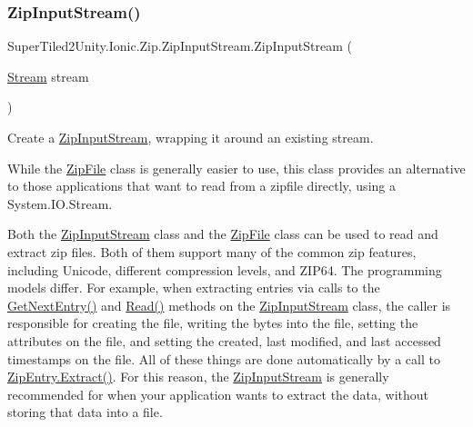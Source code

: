 \subsubsection{\texorpdfstring{Zip\+Input\+Stream()}{ZipInputStream()}\hspace{0.1cm}{\footnotesize\ttfamily [1/3]}}
{\footnotesize\ttfamily Super\+Tiled2\+Unity.\+Ionic.\+Zip.\+Zip\+Input\+Stream.\+Zip\+Input\+Stream (\begin{DoxyParamCaption}\item[{\mbox{\hyperlink{namespace_super_tiled2_unity_1_1_ionic_1_1_zip_a9ced5352c56e7e0fceff15b534073c83aeae835e83c0494a376229f254f7d3392}{Stream}}}]{stream }\end{DoxyParamCaption})}



Create a {\ttfamily \mbox{\hyperlink{class_super_tiled2_unity_1_1_ionic_1_1_zip_1_1_zip_input_stream}{Zip\+Input\+Stream}}}, wrapping it around an existing stream. 

While the \mbox{\hyperlink{class_super_tiled2_unity_1_1_ionic_1_1_zip_1_1_zip_file}{Zip\+File}} class is generally easier to use, this class provides an alternative to those applications that want to read from a zipfile directly, using a System.\+I\+O.\+Stream. 

Both the {\ttfamily \mbox{\hyperlink{class_super_tiled2_unity_1_1_ionic_1_1_zip_1_1_zip_input_stream}{Zip\+Input\+Stream}}} class and the {\ttfamily \mbox{\hyperlink{class_super_tiled2_unity_1_1_ionic_1_1_zip_1_1_zip_file}{Zip\+File}}} class can be used to read and extract zip files. Both of them support many of the common zip features, including Unicode, different compression levels, and Z\+I\+P64. The programming models differ. For example, when extracting entries via calls to the {\ttfamily \mbox{\hyperlink{class_super_tiled2_unity_1_1_ionic_1_1_zip_1_1_zip_input_stream_afd108d06a4650f63b0ec80d0698fc886}{Get\+Next\+Entry()}}} and {\ttfamily \mbox{\hyperlink{class_super_tiled2_unity_1_1_ionic_1_1_zip_1_1_zip_input_stream_a172a23a02d3c7a34db7c6648c55fd299}{Read()}}} methods on the {\ttfamily \mbox{\hyperlink{class_super_tiled2_unity_1_1_ionic_1_1_zip_1_1_zip_input_stream}{Zip\+Input\+Stream}}} class, the caller is responsible for creating the file, writing the bytes into the file, setting the attributes on the file, and setting the created, last modified, and last accessed timestamps on the file. All of these things are done automatically by a call to \mbox{\hyperlink{class_super_tiled2_unity_1_1_ionic_1_1_zip_1_1_zip_entry_a9d65543aadd23e47e188175412891b42}{Zip\+Entry.\+Extract()}}. For this reason, the {\ttfamily \mbox{\hyperlink{class_super_tiled2_unity_1_1_ionic_1_1_zip_1_1_zip_input_stream}{Zip\+Input\+Stream}}} is generally recommended for when your application wants to extract the data, without storing that data into a file. 

